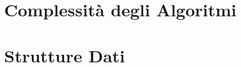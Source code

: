 



\begin{titlepage}
    \maketitle
    \thispagestyle{empty}  %
\end{titlepage}

\section*{Complessità degli Algoritmi}


\section*{Strutture Dati}


% 

